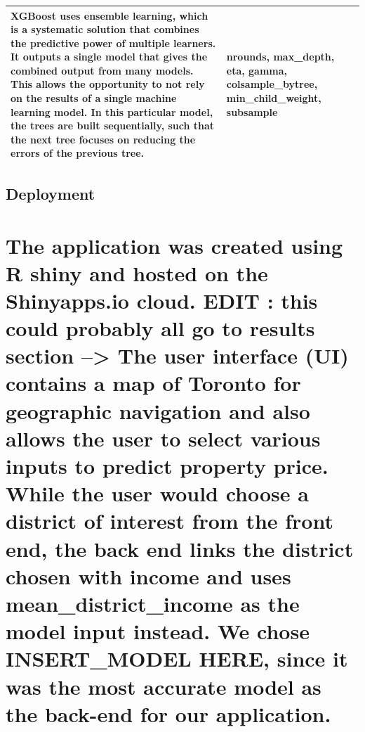 \documentclass[11pt,]{article}
\begin{document}
\begin{longtable}[]{@{}lll@{}}
\begin{minipage}[t]{0.73\columnwidth}
XGBoost uses ensemble learning, which is a systematic solution that
combines the predictive power of multiple learners. It outputs a single
model that gives the combined output from many models. This allows the
opportunity to not rely on the results of a single machine learning
model. In this particular model, the trees are built sequentially, such
that the next tree focuses on reducing the errors of the previous
tree.\strut
\end{minipage} & \begin{minipage}[t]{0.13\columnwidth}\raggedright
nrounds, max\_depth, eta, gamma, colsample\_bytree, min\_child\_weight,
subsample\strut
\end{minipage}\tabularnewline
\bottomrule
\end{longtable}

\hypertarget{deployment}{%
\subsection{Deployment}\label{deployment}}

\hypertarget{the-application-was-created-using-r-shiny-and-hosted-on-the-shinyapps.io-cloud.-edit-this-could-probably-all-go-to-results-section-the-user-interface-ui-contains-a-map-of-toronto-for-geographic-navigation-and-also-allows-the-user-to-select-various-inputs-to-predict-property-price.-while-the-user-would-choose-a-district-of-interest-from-the-front-end-the-back-end-links-the-district-chosen-with-income-and-uses-mean_district_income-as-the-model-input-instead.-we-chose-insert_model-here-since-it-was-the-most-accurate-model-as-the-back-end-for-our-application.}{%
\section{The application was created using R shiny and hosted on the
Shinyapps.io cloud. EDIT : this could probably all go to results section
--\textgreater{} The user interface (UI) contains a map of Toronto for
geographic navigation and also allows the user to select various inputs
to predict property price. While the user would choose a district of
interest from the front end, the back end links the district chosen with
income and uses mean\_district\_income as the model input instead. We
chose INSERT\_MODEL HERE, since it was the most accurate model as the
back-end for our
application.}\label{the-application-was-created-using-r-shiny-and-hosted-on-the-shinyapps.io-cloud.-edit-this-could-probably-all-go-to-results-section-the-user-interface-ui-contains-a-map-of-toronto-for-geographic-navigation-and-also-allows-the-user-to-select-various-inputs-to-predict-property-price.-while-the-user-would-choose-a-district-of-interest-from-the-front-end-the-back-end-links-the-district-chosen-with-income-and-uses-mean_district_income-as-the-model-input-instead.-we-chose-insert_model-here-since-it-was-the-most-accurate-model-as-the-back-end-for-our-application.}}
\end{document}
